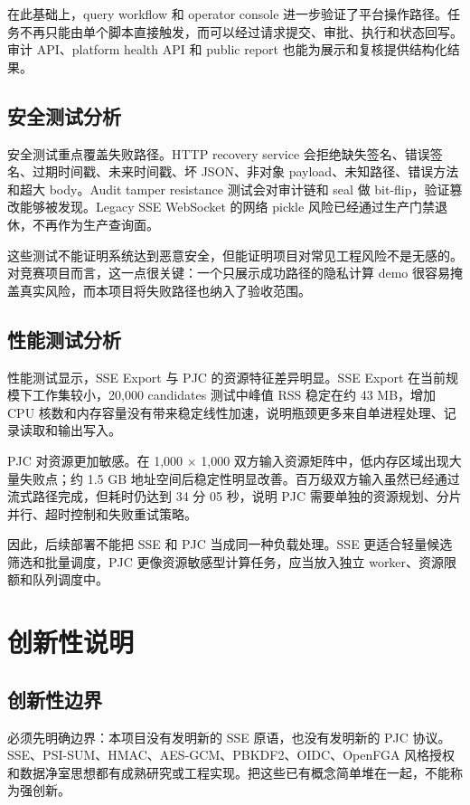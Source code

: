 \documentclass[UTF8,a4paper,12pt,oneside]{ctexrep}
\begin{document}
在此基础上，query workflow 和 operator console 进一步验证了平台操作路径。任务不再只能由单个脚本直接触发，而可以经过请求提交、审批、执行和状态回写。审计 API、platform health API 和 public report 也能为展示和复核提供结构化结果。

\section{安全测试分析}

安全测试重点覆盖失败路径。HTTP recovery service 会拒绝缺失签名、错误签名、过期时间戳、未来时间戳、坏 JSON、非对象 payload、未知路径、错误方法和超大 body。Audit tamper resistance 测试会对审计链和 seal 做 bit-flip，验证篡改能够被发现。Legacy SSE WebSocket 的网络 pickle 风险已经通过生产门禁退休，不再作为生产查询面。

这些测试不能证明系统达到恶意安全，但能证明项目对常见工程风险不是无感的。对竞赛项目而言，这一点很关键：一个只展示成功路径的隐私计算 demo 很容易掩盖真实风险，而本项目将失败路径也纳入了验收范围。

\section{性能测试分析}

性能测试显示，SSE Export 与 PJC 的资源特征差异明显。SSE Export 在当前规模下工作集较小，20,000 candidates 测试中峰值 RSS 稳定在约 43 MB，增加 CPU 核数和内存容量没有带来稳定线性加速，说明瓶颈更多来自单进程处理、记录读取和输出写入。

PJC 对资源更加敏感。在 1,000 $\times$ 1,000 双方输入资源矩阵中，低内存区域出现大量失败点；约 1.5 GB 地址空间后稳定性明显改善。百万级双方输入虽然已经通过流式路径完成，但耗时仍达到 34 分 05 秒，说明 PJC 需要单独的资源规划、分片并行、超时控制和失败重试策略。

因此，后续部署不能把 SSE 和 PJC 当成同一种负载处理。SSE 更适合轻量候选筛选和批量调度，PJC 更像资源敏感型计算任务，应当放入独立 worker、资源限额和队列调度中。

\chapter{创新性说明}

\section{创新性边界}

必须先明确边界：本项目没有发明新的 SSE 原语，也没有发明新的 PJC 协议。SSE、PSI-SUM、HMAC、AES-GCM、PBKDF2、OIDC、OpenFGA 风格授权和数据净室思想都有成熟研究或工程实现。把这些已有概念简单堆在一起，不能称为强创新。
\end{document}
